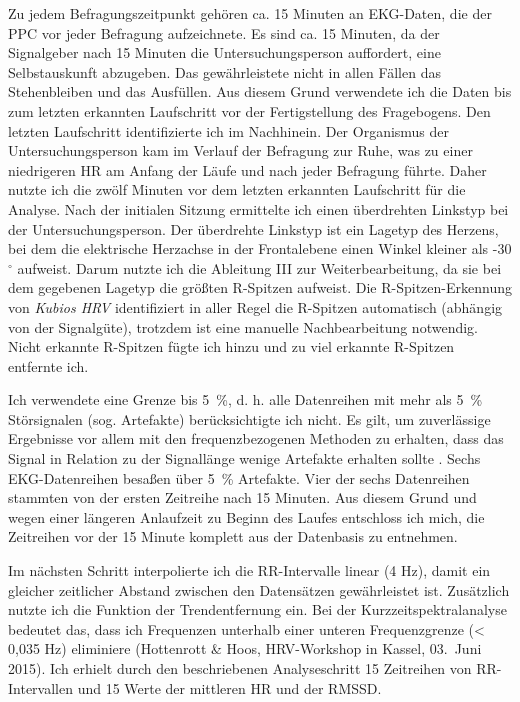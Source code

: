 Zu jedem Befragungszeitpunkt gehören ca. 15 Minuten an \ac{EKG}-Daten, die der \ac{PPC} vor jeder Befragung aufzeichnete. Es sind ca. 15 Minuten, da der Signalgeber nach 15 Minuten die Untersuchungsperson auffordert, eine Selbstauskunft abzugeben. Das gewährleistete nicht in allen Fällen das Stehenbleiben und das Ausfüllen. Aus diesem Grund verwendete ich die Daten bis zum letzten erkannten Laufschritt vor der Fertigstellung des Fragebogens. Den letzten Laufschritt identifizierte ich im Nachhinein. Der Organismus der Untersuchungsperson kam im Verlauf der Befragung zur Ruhe, was zu einer niedrigeren \ac{HR} am Anfang der Läufe und nach jeder Befragung führte. Daher nutzte ich die zwölf Minuten vor dem letzten erkannten Laufschritt für die Analyse. Nach der initialen Sitzung ermittelte ich einen überdrehten Linkstyp bei der Untersuchungsperson. Der überdrehte Linkstyp ist ein Lagetyp des Herzens, bei dem die elektrische Herzachse in der Frontalebene einen Winkel kleiner als -30 $^{\circ}$ aufweist. Darum nutzte ich die Ableitung III zur Weiterbearbeitung, da sie bei dem gegebenen Lagetyp die größten R-Spitzen aufweist. Die R-Spitzen-Erkennung von \emph{Kubios HRV} identifiziert in aller Regel die R-Spitzen automatisch (abhängig von der Signalgüte), trotzdem ist eine manuelle Nachbearbeitung notwendig. Nicht erkannte R-Spitzen fügte ich hinzu und zu viel erkannte R-Spitzen entfernte ich.

Ich verwendete eine Grenze bis 5~\%, d. h. alle Datenreihen mit mehr als 5~\% Störsignalen (sog. Artefakte) berücksichtigte ich nicht. Es gilt, um zuverlässige Ergebnisse vor allem mit den frequenzbezogenen Methoden zu erhalten, dass das Signal in Relation zu der Signallänge wenige Artefakte erhalten sollte \citep[z.~B. < 5 - 10~\%; vgl. ][S.~77]{Sammito2015}. Sechs \ac{EKG}-Datenreihen besaßen über 5~\% Artefakte. Vier der sechs Datenreihen stammten von der ersten Zeitreihe nach 15 Minuten. Aus diesem Grund und wegen einer längeren Anlaufzeit zu Beginn des Laufes entschloss ich mich, die Zeitreihen vor der 15 Minute komplett aus der Datenbasis zu entnehmen.

Im nächsten Schritt interpolierte ich die RR-Intervalle linear (4 Hz), damit ein gleicher zeitlicher Abstand zwischen den Datensätzen gewährleistet ist. Zusätzlich nutzte ich die Funktion der Trendentfernung ein. Bei der Kurzzeitspektralanalyse bedeutet das, dass ich Frequenzen unterhalb einer unteren Frequenzgrenze (< 0,035 Hz) eliminiere (Hottenrott \& Hoos, \ac{HRV}-Workshop in Kassel, 03.~Juni 2015). Ich erhielt durch den beschriebenen Analyseschritt 15 Zeitreihen von RR-Intervallen und 15 Werte der mittleren \ac{HR} und der \acs{RMSSD}.

